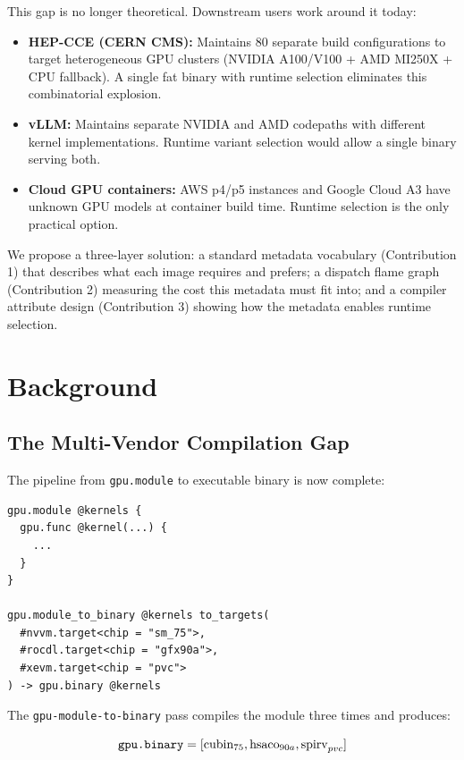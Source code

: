 \documentclass[11pt]{article}
\begin{document}
This gap is no longer theoretical.
Downstream users work around it today:
\begin{itemize}
  \item \textbf{HEP-CCE (CERN CMS):} Maintains 80 separate build configurations to target heterogeneous GPU clusters (NVIDIA A100/V100 + AMD MI250X + CPU fallback).
    A single fat binary with runtime selection eliminates this combinatorial explosion.
  \item \textbf{vLLM:} Maintains separate NVIDIA and AMD codepaths with different kernel implementations.
    Runtime variant selection would allow a single binary serving both.
  \item \textbf{Cloud GPU containers:} AWS p4/p5 instances and Google Cloud A3 have unknown GPU models at container build time.
    Runtime selection is the only practical option.
\end{itemize}

We propose a three-layer solution:
a standard metadata vocabulary (Contribution 1) that describes what each image requires and prefers;
a dispatch flame graph (Contribution 2) measuring the cost this metadata must fit into;
and a compiler attribute design (Contribution 3) showing how the metadata enables runtime selection.

\section{Background}

\subsection{The Multi-Vendor Compilation Gap}

The pipeline from \texttt{gpu.module} to executable binary is now complete:

\begin{lstlisting}[language=MLIR]
gpu.module @kernels {
  gpu.func @kernel(...) {
    ...
  }
}

gpu.module_to_binary @kernels to_targets(
  #nvvm.target<chip = "sm_75">,
  #rocdl.target<chip = "gfx90a">,
  #xevm.target<chip = "pvc">
) -> gpu.binary @kernels
\end{lstlisting}

The \texttt{gpu-module-to-binary} pass compiles the module three times and produces:

\begin{equation*}
\text{\texttt{gpu.binary}} = [\text{cubin}_{75}, \text{hsaco}_{90a}, \text{spirv}_{pvc}]
\end{equation*}
\end{document}
